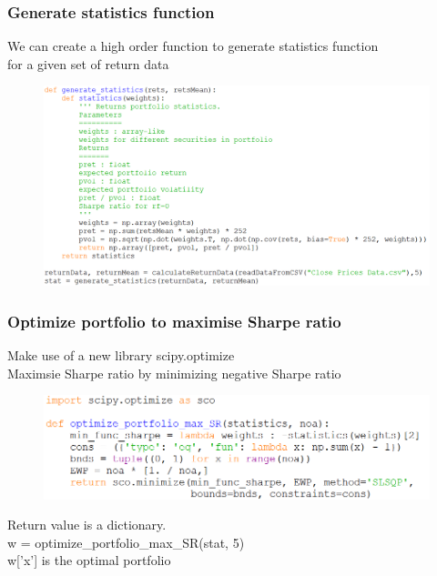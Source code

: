 \documentclass{beamer}
\begin{document}
\begin{frame}
\frametitle{Generate statistics function}
We can create a high order function to generate statistics function\\
for a given set of return data
\begin{figure}[H]
	\includegraphics[scale=0.37]{generate_statistics.png}
\end{figure}
\end{frame}

\begin{frame}
\frametitle{Optimize portfolio to maximise Sharpe ratio}
Make use of a new library scipy.optimize\\
Maximsie Sharpe ratio by minimizing negative Sharpe ratio
\begin{figure}[H]
	\includegraphics[scale=0.48]{optimize_max_SR.png}
\end{figure}
\begin{center}
Return value is a dictionary.\\
w = optimize\_portfolio\_max\_SR(stat, 5) \\
w['x'] is the optimal portfolio
\end{center}
\end{frame}
\end{document}
